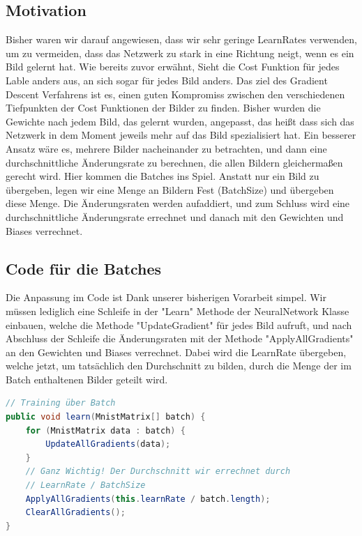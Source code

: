 \documentclass[12pt]{article}
\begin{document}
\subsection{Motivation}
Bisher waren wir darauf angewiesen, dass wir sehr geringe LearnRates verwenden, um zu vermeiden, dass das Netzwerk zu stark in eine Richtung neigt, wenn es ein Bild gelernt hat. Wie bereits zuvor erwähnt, Sieht die Cost Funktion für jedes Lable anders aus, an sich sogar für jedes Bild anders. Das ziel des Gradient Descent Verfahrens ist es, einen guten Kompromiss zwischen den verschiedenen Tiefpunkten der Cost Funktionen der Bilder zu finden.
Bisher wurden die Gewichte nach jedem Bild, das gelernt wurden, angepasst, das heißt dass sich das Netzwerk in dem Moment jeweils mehr auf das Bild spezialisiert hat. Ein besserer Ansatz wäre es, mehrere Bilder nacheinander zu betrachten, und dann eine durchschnittliche Änderungsrate zu berechnen, die allen Bildern gleichermaßen gerecht wird. Hier kommen die Batches ins Spiel.
Anstatt nur ein Bild zu übergeben, legen wir eine Menge an Bildern Fest (BatchSize) und übergeben diese Menge. Die Änderungsraten werden aufaddiert, und zum Schluss wird eine durchschnittliche Änderungsrate errechnet und danach mit den Gewichten und Biases verrechnet.
\subsection{Code für die Batches}
Die Anpassung im Code ist Dank unserer bisherigen Vorarbeit simpel.
Wir müssen lediglich eine Schleife in der "Learn" Methode der NeuralNetwork Klasse einbauen, welche die Methode "UpdateGradient" für jedes Bild aufruft, und nach Abschluss der Schleife die Änderungsraten mit der Methode "ApplyAllGradients" an den Gewichten und Biases verrechnet. Dabei wird die LearnRate übergeben, welche jetzt, um tatsächlich den Durchschnitt zu bilden, durch die Menge der im Batch enthaltenen Bilder geteilt wird.\begin{lstlisting}[language=Java]
// Training über Batch
public void learn(MnistMatrix[] batch) {
    for (MnistMatrix data : batch) {
        UpdateAllGradients(data);
    }
    // Ganz Wichtig! Der Durchschnitt wir errechnet durch
    // LearnRate / BatchSize
    ApplyAllGradients(this.learnRate / batch.length);
    ClearAllGradients();
}
\end{lstlisting}
\end{document}
